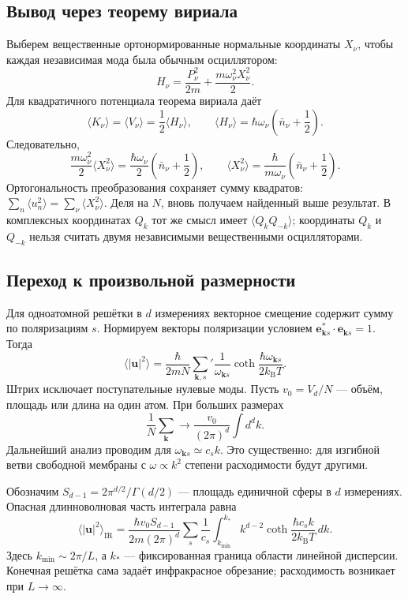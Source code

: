 \documentclass[../final.tex]{subfiles}
\begin{document}
\subsection*{Вывод через теорему вириала}

Выберем вещественные ортонормированные нормальные координаты $X_\nu$,
чтобы каждая независимая мода была обычным осциллятором:
\[
    H_\nu=\frac{P_\nu^2}{2m}+\frac{m\omega_\nu^2X_\nu^2}{2}.
\]
Для квадратичного потенциала теорема вириала даёт
\[
    \langle K_\nu\rangle=\langle V_\nu\rangle
       =\frac12\langle H_\nu\rangle,
    \qquad
    \langle H_\nu\rangle=\hbar\omega_\nu
       \left(\bar n_\nu+\frac12\right).
\]
Следовательно,
\[
    \frac{m\omega_\nu^2}{2}\langle X_\nu^2\rangle
       =\frac{\hbar\omega_\nu}{2}
          \left(\bar n_\nu+\frac12\right),
    \qquad
    \langle X_\nu^2\rangle
       =\frac{\hbar}{m\omega_\nu}
          \left(\bar n_\nu+\frac12\right).
\]
Ортогональность преобразования сохраняет сумму квадратов:
$\sum_n\langle u_n^2\rangle=\sum_\nu\langle X_\nu^2\rangle$.
Деля на $N$, вновь получаем найденный выше результат.
В комплексных координатах $Q_k$ тот же смысл имеет
$\langle Q_kQ_{-k}\rangle$; координаты $Q_k$ и $Q_{-k}$ нельзя
считать двумя независимыми вещественными осцилляторами.

\subsection*{Переход к произвольной размерности}

Для одноатомной решётки в $d$ измерениях векторное смещение
содержит сумму по поляризациям $s$. Нормируем векторы поляризации
условием $\boldsymbol e_{\boldsymbol k s}^*
\mathbin{\cdot}\boldsymbol e_{\boldsymbol k s}=1$. Тогда
\[
    \langle|\boldsymbol u|^2\rangle
       =\frac{\hbar}{2mN}\sum_{\boldsymbol k,s}'
          \frac1{\omega_{\boldsymbol k s}}
          \coth\frac{\hbar\omega_{\boldsymbol k s}}{2k_{\mathrm B}T}.
\]
Штрих исключает поступательные нулевые моды. Пусть $v_0=V_d/N$ ---
объём, площадь или длина на один атом. При больших размерах
\[
    \frac1N\sum_{\boldsymbol k}\longrightarrow
       \frac{v_0}{(2\pi)^d}\int d^dk.
\]
Дальнейший анализ проводим для
$\omega_{\boldsymbol k s}\simeq c_s k$.
Это существенно: для изгибной ветви свободной мембраны
с $\omega\propto k^2$ степени расходимости будут другими.

Обозначим $S_{d-1}=2\pi^{d/2}/\Gamma(d/2)$ --- площадь единичной
сферы в $d$ измерениях. Опасная длинноволновая часть интеграла равна
\[
    \langle|\boldsymbol u|^2\rangle_{\mathrm{IR}}
       =\frac{\hbar v_0 S_{d-1}}{2m(2\pi)^d}
          \sum_s\frac1{c_s}
          \int_{k_{\min}}^{k_*}
             k^{d-2}\coth\frac{\hbar c_sk}{2k_{\mathrm B}T}\,dk.
\]
Здесь $k_{\min}\sim2\pi/L$, а $k_*$ --- фиксированная граница
области линейной дисперсии. Конечная решётка сама задаёт
инфракрасное обрезание; расходимость возникает при $L\to\infty$.
\end{document}
